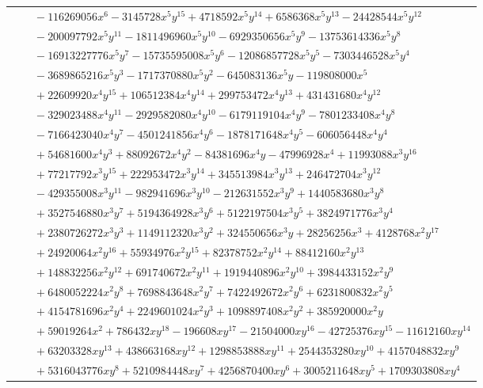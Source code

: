 \documentclass[11pt]{article}
\begin{document}
\begin{longtable}{@{}ll@{}}
 & $\quad -116269056x^{6}-3145728x^{5}y^{15}+4718592x^{5}y^{14}+6586368x^{5}y^{13}-24428544x^{5}y^{12}$\\
 & $\quad -200097792x^{5}y^{11}-1811496960x^{5}y^{10}-6929350656x^{5}y^{9}-13753614336x^{5}y^{8}$\\
 & $\quad -16913227776x^{5}y^{7}-15735595008x^{5}y^{6}-12086857728x^{5}y^{5}-7303446528x^{5}y^{4}$\\
 & $\quad -3689865216x^{5}y^{3}-1717370880x^{5}y^{2}-645083136x^{5}y-119808000x^{5}$\\
 & $\quad +22609920x^{4}y^{15}+106512384x^{4}y^{14}+299753472x^{4}y^{13}+431431680x^{4}y^{12}$\\
 & $\quad -329023488x^{4}y^{11}-2929582080x^{4}y^{10}-6179119104x^{4}y^{9}-7801233408x^{4}y^{8}$\\
 & $\quad -7166423040x^{4}y^{7}-4501241856x^{4}y^{6}-1878171648x^{4}y^{5}-606056448x^{4}y^{4}$\\
 & $\quad +54681600x^{4}y^{3}+88092672x^{4}y^{2}-84381696x^{4}y-47996928x^{4}+11993088x^{3}y^{16}$\\
 & $\quad +77217792x^{3}y^{15}+222953472x^{3}y^{14}+345513984x^{3}y^{13}+246472704x^{3}y^{12}$\\
 & $\quad -429355008x^{3}y^{11}-982941696x^{3}y^{10}-212631552x^{3}y^{9}+1440583680x^{3}y^{8}$\\
 & $\quad +3527546880x^{3}y^{7}+5194364928x^{3}y^{6}+5122197504x^{3}y^{5}+3824971776x^{3}y^{4}$\\
 & $\quad +2380726272x^{3}y^{3}+1149112320x^{3}y^{2}+324550656x^{3}y+28256256x^{3}+4128768x^{2}y^{17}$\\
 & $\quad +24920064x^{2}y^{16}+55934976x^{2}y^{15}+82378752x^{2}y^{14}+88412160x^{2}y^{13}$\\
 & $\quad +148832256x^{2}y^{12}+691740672x^{2}y^{11}+1919440896x^{2}y^{10}+3984433152x^{2}y^{9}$\\
 & $\quad +6480052224x^{2}y^{8}+7698843648x^{2}y^{7}+7422492672x^{2}y^{6}+6231800832x^{2}y^{5}$\\
 & $\quad +4154781696x^{2}y^{4}+2249601024x^{2}y^{3}+1098897408x^{2}y^{2}+385920000x^{2}y$\\
 & $\quad +59019264x^{2}+786432xy^{18}-196608xy^{17}-21504000xy^{16}-42725376xy^{15}-11612160xy^{14}$\\
 & $\quad +63203328xy^{13}+438663168xy^{12}+1298853888xy^{11}+2544353280xy^{10}+4157048832xy^{9}$\\
 & $\quad +5316043776xy^{8}+5210984448xy^{7}+4256870400xy^{6}+3005211648xy^{5}+1709303808xy^{4}$\\

\end{longtable}
\end{document}
